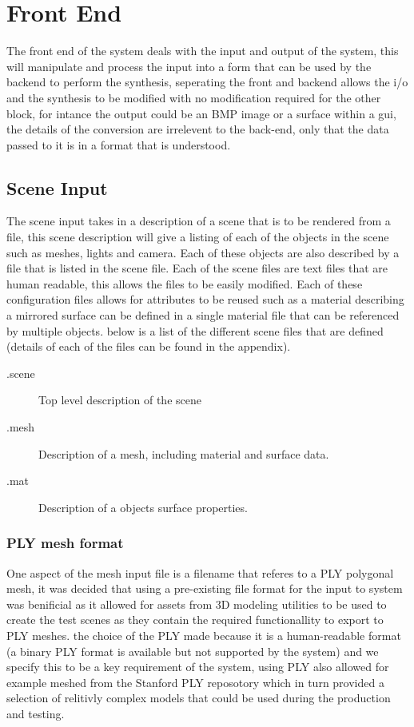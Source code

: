 \section{Front End}
The front end of the system deals with the input and output of the system, this will manipulate and process
the input into a form that can be used by the backend to perform the synthesis, seperating the front and backend
allows the i/o and the synthesis to be modified with no modification required for the other block,
for intance the output could be an BMP image or a surface within a gui, the details of the conversion are
irrelevent to the back-end, only that the data passed to it is in a format that is understood.

\subsection{Scene Input}
The scene input takes in a description of a scene that is to be rendered from a file, this scene description
will give a listing of each of the objects in the scene such as meshes, lights and camera. Each of these
objects are also described by a file that is listed in the scene file. Each of the scene files are text files
that are human readable, this allows the files to be easily modified. Each of these configuration files allows
for attributes to be reused such as a material describing a mirrored surface can be defined in a single material
file that can be referenced by multiple objects. below is a list of the different scene files that are defined
(details of each of the files can be found in the appendix).

\begin{description}
\item[.scene] Top level description of the scene
\item[.mesh] Description of a mesh, including material and surface data.
\item[.mat] Description of a objects surface properties.
\end{description}

\subsubsection{PLY mesh format}
One aspect of the mesh input file is a filename that referes to a PLY polygonal mesh, it was decided that using
a pre-existing file format for the input to system was benificial as it allowed for assets from 3D modeling
utilities to be used to create the test scenes as they contain the required functionallity to export to PLY
meshes. the choice of the PLY made because it is a human-readable format (a binary PLY format is available but
not supported by the system) and we specify this to be a key requirement of the system, 
using PLY also allowed for example meshed from the Stanford PLY reposotory which in turn provided a selection of
relitivly complex models that could be used during the production and testing.

